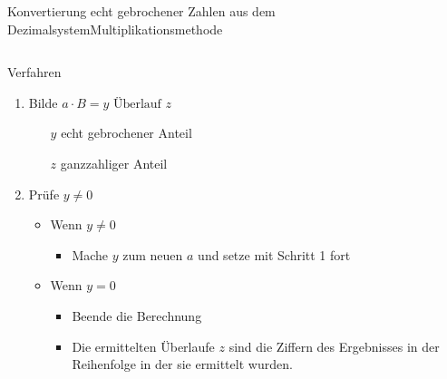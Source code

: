 \documentclass[xelatex,aspectratio=169]{beamer}
\begin{document}
\begin{frame}[t]{Konvertierung echt gebrochener Zahlen aus dem Dezimalsystem}{Multiplikationsmethode}
  \begin{columns}
    \begin{column}{0.5\textwidth}
      \begin{block}{Verfahren}
        \begin{enumerate}
          \item Bilde $a \cdot B = y \mbox{ Überlauf } z$
                \begin{itemize}
                  \item[$y$] echt gebrochener Anteil
                  \item[$z$] ganzzahliger Anteil
                \end{itemize}
          \item Prüfe $y \neq 0$
                \begin{itemize}
                  \item Wenn $y \neq 0$
                        \begin{itemize}
                          \item Mache $y$ zum neuen $a$ und setze mit Schritt 1 fort
                        \end{itemize}
                  \item Wenn $y = 0$
                        \begin{itemize}
                          \item Beende die Berechnung
                          \item Die ermittelten Überlaufe $z$ sind die Ziffern des Ergebnisses in der Reihenfolge in der sie ermittelt wurden.
                        \end{itemize}
                \end{itemize}
        \end{enumerate}
      \end{block}
    \end{column}
    \begin{column}{0.5\textwidth}

\end{column}
\end{columns}
\end{frame}
\end{document}
